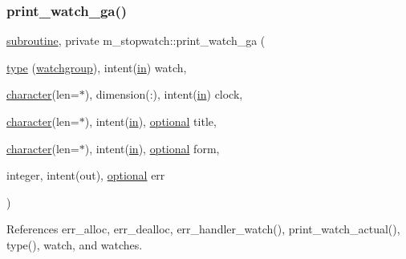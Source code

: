 \subsubsection{\texorpdfstring{print\+\_\+watch\+\_\+ga()}{print\_watch\_ga()}}
{\footnotesize\ttfamily \hyperlink{M__stopwatch_83_8txt_acfbcff50169d691ff02d4a123ed70482}{subroutine}, private m\+\_\+stopwatch\+::print\+\_\+watch\+\_\+ga (\begin{DoxyParamCaption}\item[{\hyperlink{stop__watch_83_8txt_a70f0ead91c32e25323c03265aa302c1c}{type} (\hyperlink{structm__stopwatch_1_1watchgroup}{watchgroup}), intent(\hyperlink{M__journal_83_8txt_afce72651d1eed785a2132bee863b2f38}{in})}]{watch,  }\item[{\hyperlink{option__stopwatch_83_8txt_abd4b21fbbd175834027b5224bfe97e66}{character}(len=$\ast$), dimension(\+:), intent(\hyperlink{M__journal_83_8txt_afce72651d1eed785a2132bee863b2f38}{in})}]{clock,  }\item[{\hyperlink{option__stopwatch_83_8txt_abd4b21fbbd175834027b5224bfe97e66}{character}(len=$\ast$), intent(\hyperlink{M__journal_83_8txt_afce72651d1eed785a2132bee863b2f38}{in}), \hyperlink{option__stopwatch_83_8txt_aa4ece75e7acf58a4843f70fe18c3ade5}{optional}}]{title,  }\item[{\hyperlink{option__stopwatch_83_8txt_abd4b21fbbd175834027b5224bfe97e66}{character}(len=$\ast$), intent(\hyperlink{M__journal_83_8txt_afce72651d1eed785a2132bee863b2f38}{in}), \hyperlink{option__stopwatch_83_8txt_aa4ece75e7acf58a4843f70fe18c3ade5}{optional}}]{form,  }\item[{integer, intent(out), \hyperlink{option__stopwatch_83_8txt_aa4ece75e7acf58a4843f70fe18c3ade5}{optional}}]{err }\end{DoxyParamCaption})\hspace{0.3cm}{\ttfamily [private]}}



References err\+\_\+alloc, err\+\_\+dealloc, err\+\_\+handler\+\_\+watch(), print\+\_\+watch\+\_\+actual(), type(), watch, and watches.

